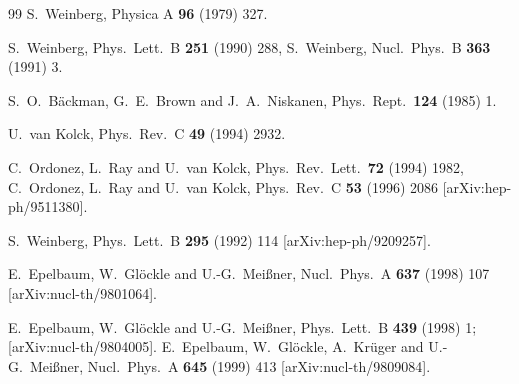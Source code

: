 \documentclass[a4paper,fleqn]{scrartcl}
\begin{document}
{\begin{thebibliography}{99}
  S.~Weinberg,
  Physica A {\bf 96} (1979) 327.

  S.~Weinberg,
  Phys.\ Lett.\  B {\bf 251} (1990) 288,
  S.~Weinberg,
  Nucl.\ Phys.\  B {\bf 363} (1991) 3.



  S.~O.~B\"ackman, G.~E.~Brown and J.~A.~Niskanen,
  Phys.\ Rept.\  {\bf 124} (1985) 1.

  U.~van Kolck,
  Phys.\ Rev.\  C {\bf 49} (1994) 2932.

  C.~Ordonez, L.~Ray and U.~van Kolck,
  Phys.\ Rev.\ Lett.\  {\bf 72} (1994) 1982,
C.~Ordonez, L.~Ray and U.~van Kolck,
  Phys.\ Rev.\  C {\bf 53} (1996) 2086
  [arXiv:hep-ph/9511380].

  S.~Weinberg,
  Phys.\ Lett.\  B {\bf 295} (1992) 114
  [arXiv:hep-ph/9209257].

  E.~Epelbaum, W.~Gl\"ockle and U.-G.~Mei\ss ner,
  Nucl.\ Phys.\  A {\bf 637} (1998) 107
  [arXiv:nucl-th/9801064].

  E.~Epelbaum, W.~Gl\"ockle and U.-G.~Mei\ss ner,
  Phys.\ Lett.\  B {\bf 439} (1998) 1;
  [arXiv:nucl-th/9804005].
  E.~Epelbaum, W.~Gl\"ockle, A.~Kr\"uger and U.-G.~Mei\ss ner,
  Nucl.\ Phys.\  A {\bf 645} (1999) 413
  [arXiv:nucl-th/9809084].


\end{thebibliography}}
\end{document}
